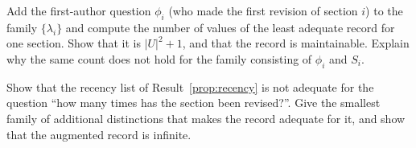 \begin{exercise}
Add the first-author question $\phi_i$ (who made the first revision of section $i$) to the family $\{\lambda_i\}$ and compute the number of values of the least adequate record for one section. Show that it is $|U|^{2}+1$, and that the record is maintainable. Explain why the same count does not hold for the family consisting of $\phi_i$ and $S_i$.\label{ex:first-author}
\end{exercise}

\begin{exercise}
Show that the recency list of Result~\ref{prop:recency} is not adequate for the question ``how many times has the section been revised?''. Give the smallest family of additional distinctions that makes the record adequate for it, and show that the augmented record is infinite.
\end{exercise}

